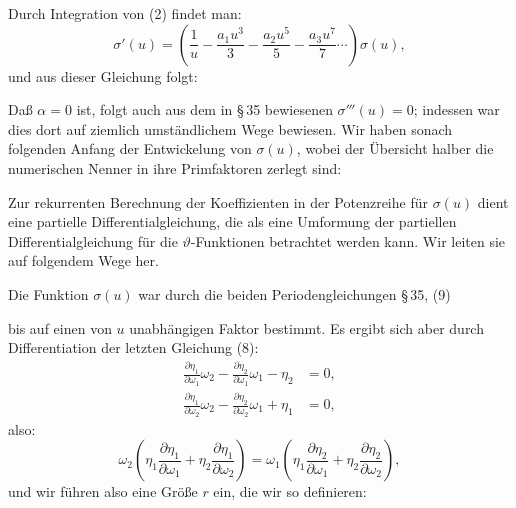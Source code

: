
Durch Integration von (2) findet man:
\[
\sigma'(u) = \left(\frac{1}{u} - \frac{a_1 u^3}{3} - \frac{a_2 u^5}{5} - \frac{a_3 u^7}{7}\cdots\right)\sigma(u),
\]
und aus dieser Gleichung folgt:


Daß $\alpha=0$ ist, folgt auch aus dem in \S\,35 bewiesenen
$\sigma'''(u) = 0$; indessen war dies dort auf ziemlich umständlichem
Wege bewiesen. Wir haben sonach folgenden Anfang der Entwickelung
 von $\sigma(u)$, wobei der Übersicht halber die numerischen
Nenner in ihre Primfaktoren zerlegt sind:


Zur rekurrenten Berechnung der Koeffizienten in der Potenzreihe
 für $\sigma(u)$ dient eine partielle Differentialgleichung, die als
eine Umformung der partiellen Differentialgleichung für die
$\vartheta$-Funktionen betrachtet werden kann. Wir leiten sie auf folgendem
 Wege her.

Die Funktion $\sigma(u)$ war durch die beiden Periodengleichungen
\S\,35, (9)


bis auf einen von $u$ unabhängigen Faktor bestimmt. Es ergibt
sich aber durch Differentiation der letzten Gleichung (8):
\[
\begin{aligned}
\frac{\partial \eta_1}{\partial \omega_1}\omega_2 - \frac{\partial \eta_2}{\partial \omega_1}\omega_1 - \eta_2 &= 0,\\
\frac{\partial \eta_1}{\partial \omega_2}\omega_2 - \frac{\partial \eta_2}{\partial \omega_2}\omega_1 + \eta_1 &= 0,
\end{aligned}
\]
also:
\[
\omega_2\left(\eta_1\frac{\partial \eta_1}{\partial \omega_1} + \eta_2\frac{\partial \eta_1}{\partial \omega_2}\right) = \omega_1\left(\eta_1\frac{\partial \eta_2}{\partial \omega_1} + \eta_2\frac{\partial \eta_2}{\partial \omega_2}\right),
\]
und wir führen also eine Größe $r$ ein, die wir so definieren:

